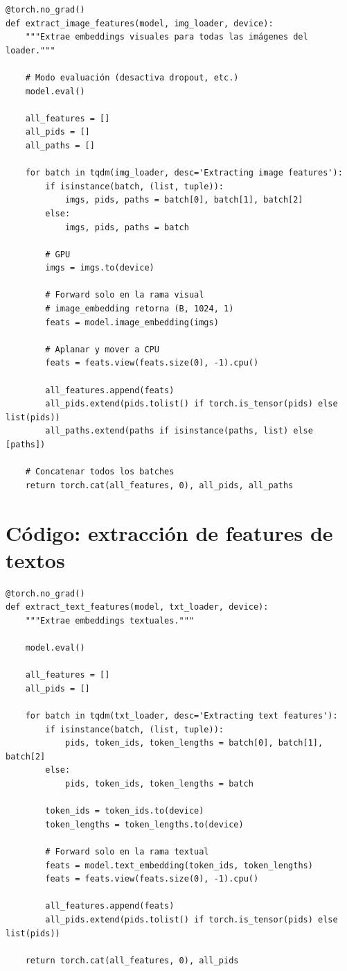 \begin{verbatim}
@torch.no_grad()
def extract_image_features(model, img_loader, device):
    """Extrae embeddings visuales para todas las imágenes del loader."""

    # Modo evaluación (desactiva dropout, etc.)
    model.eval()

    all_features = []
    all_pids = []
    all_paths = []

    for batch in tqdm(img_loader, desc='Extracting image features'):
        if isinstance(batch, (list, tuple)):
            imgs, pids, paths = batch[0], batch[1], batch[2]
        else:
            imgs, pids, paths = batch

        # GPU
        imgs = imgs.to(device)

        # Forward solo en la rama visual
        # image_embedding retorna (B, 1024, 1)
        feats = model.image_embedding(imgs)

        # Aplanar y mover a CPU
        feats = feats.view(feats.size(0), -1).cpu()

        all_features.append(feats)
        all_pids.extend(pids.tolist() if torch.is_tensor(pids) else list(pids))
        all_paths.extend(paths if isinstance(paths, list) else [paths])

    # Concatenar todos los batches
    return torch.cat(all_features, 0), all_pids, all_paths
\end{verbatim}

\section{Código: extracción de features de textos}

\begin{verbatim}
@torch.no_grad()
def extract_text_features(model, txt_loader, device):
    """Extrae embeddings textuales."""

    model.eval()

    all_features = []
    all_pids = []

    for batch in tqdm(txt_loader, desc='Extracting text features'):
        if isinstance(batch, (list, tuple)):
            pids, token_ids, token_lengths = batch[0], batch[1], batch[2]
        else:
            pids, token_ids, token_lengths = batch

        token_ids = token_ids.to(device)
        token_lengths = token_lengths.to(device)

        # Forward solo en la rama textual
        feats = model.text_embedding(token_ids, token_lengths)
        feats = feats.view(feats.size(0), -1).cpu()

        all_features.append(feats)
        all_pids.extend(pids.tolist() if torch.is_tensor(pids) else list(pids))

    return torch.cat(all_features, 0), all_pids
\end{verbatim}


